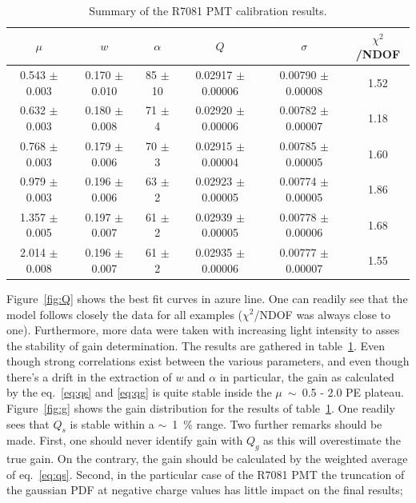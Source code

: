 \documentclass[a4paper,11pt]{article}
\begin{document}
\begin{table}[t!]
\centering
\begin{tabular}{| c  || c | c | c | c || c |}
\hline
$\mu$                      & $w$                         &  $\alpha$         &  $Q$                               &  $\sigma$ & $\chi^2$/NDOF\\[0.6ex] \hline\hline
0.543 $\pm$ 0.003  & 0.170 $\pm$ 0.010  &  85 $\pm$ 10  & 0.02917 $\pm$ 0.00006 &  0.00790 $\pm$ 0.00008 & 1.52 \\
0.632 $\pm$ 0.003  & 0.180 $\pm$ 0.008  &  71 $\pm$   4  & 0.02920 $\pm$ 0.00006 &  0.00782 $\pm$ 0.00007 & 1.18 \\
0.768 $\pm$ 0.003  & 0.179 $\pm$ 0.006  &  70 $\pm$   3  & 0.02915 $\pm$ 0.00004 &  0.00785 $\pm$ 0.00005 & 1.60 \\
0.979 $\pm$ 0.003  & 0.196 $\pm$ 0.006  &  63 $\pm$   2  & 0.02923 $\pm$ 0.00005 &  0.00774 $\pm$ 0.00005 & 1.86 \\
1.357 $\pm$ 0.005  & 0.197 $\pm$ 0.007  &  61 $\pm$   2  & 0.02939 $\pm$ 0.00005 &  0.00778 $\pm$ 0.00006 & 1.68 \\
2.014 $\pm$ 0.008  & 0.196 $\pm$ 0.007  &  61 $\pm$   2  & 0.02935 $\pm$ 0.00006 &  0.00777 $\pm$ 0.00007 & 1.55
\\[0.6ex] \hline\hline
\end{tabular}
\caption{Summary of the R7081 PMT calibration results.}
\label{tab:money}
\end{table}
Figure~\ref{fig:Q} shows the best fit curves in azure line. 
One can readily see that the model follows closely the data for all examples ($\chi^2$/NDOF was always close to one). 
Furthermore, more data were taken with increasing light intensity to asses the stability of gain determination. 
The results are gathered in table~\ref{tab:money}. 
Even though strong correlations exist between the various parameters, and even though there's a drift in the extraction of $w$ and $\alpha$  in particular,
the gain as calculated by the eq.~\eqref{eq:qs} and \eqref{eq:qg} is quite stable inside the $\mu$~$\sim$~0.5 - 2.0 PE plateau. 
Figure~\ref{fig:g} shows the gain distribution for the results of table~\ref{tab:money}. One readily sees that $Q_s$ is stable within a $\sim$~1~\% range. 
Two further remarks should be made. First, one should never identify gain with $Q_g$ as this will overestimate the true gain. 
On the contrary, the gain should be calculated by the weighted average of eq.~\eqref{eq:qs}. 
Second, in the particular case of the R7081 PMT the truncation of the gaussian PDF at negative charge values has little impact on the final results; 
\end{document}
